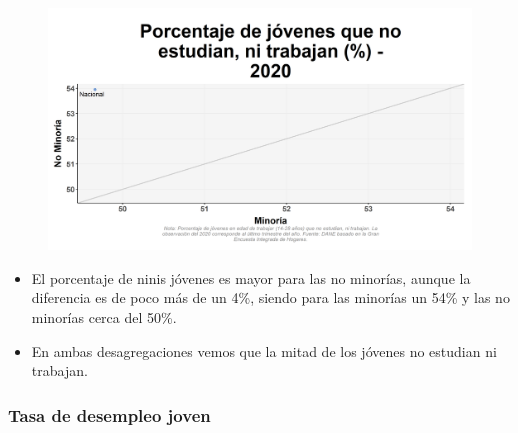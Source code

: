     \begin{figure}[H]
        \caption[Porcentaje de jóvenes que no estudian, ni trabajan por minorías y no minorías para 2020 ]{\label{ninijov_minoria_scatter} }
        \begin{center}
        \includegraphics[width=\textwidth,keepaspectratio]{img/var_40_scatter.png}
        \end{center}
    \end{figure}
            \begin{itemize}
                \item El porcentaje de ninis jóvenes es mayor para las no minorías, aunque la diferencia es de poco más de un 4\%, siendo para las minorías un 54\% y las no minorías cerca del 50\%.
                \item En ambas desagregaciones vemos que la mitad de los jóvenes no estudian ni trabajan.
                \end{itemize}

        \subsubsection{Tasa de desempleo joven}


